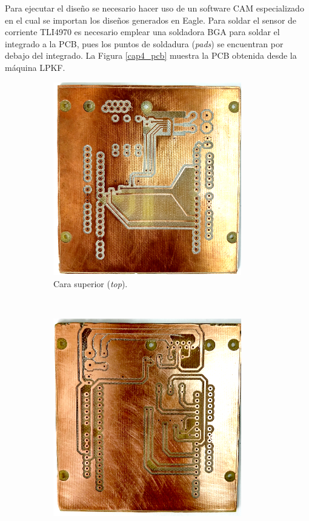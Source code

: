 Para ejecutar el diseño se necesario hacer uso de un software CAM especializado en el cual se importan los diseños generados en Eagle\textregistered.  Para soldar el sensor de corriente TLI4970 es necesario emplear una soldadora BGA para soldar el integrado a la PCB, pues los puntos de soldadura (\textit{pads}) se encuentran por debajo del integrado. La Figura \ref{cap4_pcb} muestra la PCB obtenida desde la máquina LPKF\textregistered.


\begin{figure}[H]
  \centering
  \begin{subfigure}[b]{0.45\textwidth}
    \includegraphics[width=0.9\textwidth]{img/cap4/top_pcb}
    \caption{Cara superior (\textit{top}).}
    \label{cap4_top_pcb}
  \end{subfigure}%
  ~
  \begin{subfigure}[b]{0.45\textwidth}
    \includegraphics[width=0.9\textwidth]{img/cap4/bottom_pcb}

\end{subfigure}
\end{figure}
